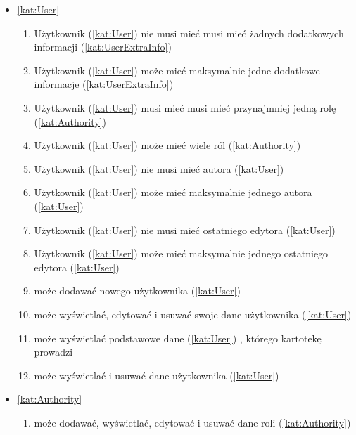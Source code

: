 \begin{itemize}[label={\textbf{Reguły dla}}, wide, labelwidth=!, labelindent=0pt]
    \setlength\itemsep{1em}
    \item\ref{kat:User}
    \begin{enumerate}[label={\textbf{REG/\protect\threedigits{\arabic{enumi}}}}, wide, labelwidth=!, align=left, leftmargin=3cm]
        \item Użytkownik (\ref{kat:User}) nie musi mieć musi mieć żadnych dodatkowych informacji (\ref{kat:UserExtraInfo})
        \item Użytkownik (\ref{kat:User}) może mieć maksymalnie jedne dodatkowe informacje (\ref{kat:UserExtraInfo})
        \item Użytkownik (\ref{kat:User}) musi mieć musi mieć przynajmniej jedną rolę (\ref{kat:Authority})
        \item Użytkownik (\ref{kat:User}) może mieć wiele ról (\ref{kat:Authority})
        \item Użytkownik (\ref{kat:User}) nie musi mieć autora (\ref{kat:User})
        \item Użytkownik (\ref{kat:User}) może mieć maksymalnie jednego autora (\ref{kat:User})
        \item Użytkownik (\ref{kat:User}) nie musi mieć ostatniego edytora (\ref{kat:User})
        \item Użytkownik (\ref{kat:User}) może mieć maksymalnie jednego ostatniego edytora (\ref{kat:User})
        \item {} może dodawać nowego użytkownika (\ref{kat:User})
        \item {} może wyświetlać, edytować i usuwać swoje dane użytkownika (\ref{kat:User})
        \item {} może wyświetlać podstawowe dane (\ref{kat:User}) , którego kartotekę prowadzi
        \item {} może wyświetlać i usuwać dane użytkownika (\ref{kat:User})
    \end{enumerate}
    \item\ref{kat:Authority}
    \begin{enumerate}[label={\textbf{REG/\protect\threedigits{\arabic{enumi}}}}, wide, labelwidth=!, align=left, leftmargin=3cm, resume]
        \item {} może dodawać, wyświetlać, edytować i usuwać dane roli (\ref{kat:Authority})
    \end{enumerate}

\end{itemize}
